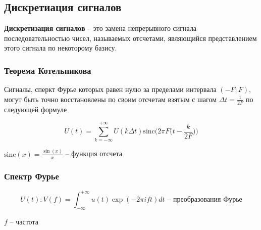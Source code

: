 \subsection{Дискретиация сигналов}

\textbf{Дискретизация сигналов} -- это замена непрерывного сигнала последовательностью чисел, называемых отсчетами, являющийся представлением этого сигнала по некоторому базису.

\subsubsection{Теорема Котельникова}

Сигналы, сперкт Фурье которых равен нулю за пределами интервала $(-F; F)$, могут быть точно восстановлены по своим отсчетам взятым с шагом $\Delta t = \frac{1}{2F}$ по следующей формуле

\begin{equation*}
    U(t) = \sum_{k=-\infty}^{+\infty} U(k \Delta t) \text{sinc} \bigg( 2 \pi F \big(t - \frac{k}{2F}\big) \bigg)
\end{equation*}

$\text{sinc} (x) = \frac{\sin(x)}{x}$ -- функция отсчета

\subsubsection{Спектр Фурье}

\begin{equation*}
    U(t) : V(f) = \int_{-\infty}^{+\infty} u(t) \exp (-2\pi ift) dt \text{ -- преобразования Фурье}
\end{equation*}

$f$ -- частота
